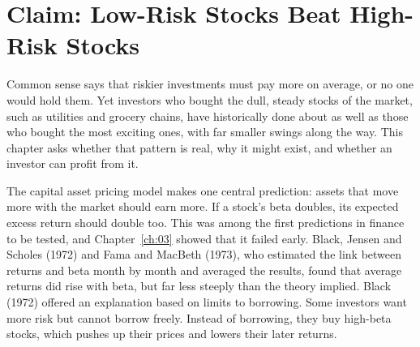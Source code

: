 \makeatletter
{}
\makeatother

\makeatletter
\makeatother

\chapter{Claim: Low-Risk Stocks Beat High-Risk Stocks}
\label{ch:14}

Common sense says that riskier investments must pay more on average, or no one would hold them. Yet investors who bought the dull, steady stocks of the market, such as utilities and grocery chains, have historically done about as well as those who bought the most exciting ones, with far smaller swings along the way. This chapter asks whether that pattern is real, why it might exist, and whether an investor can profit from it.

The capital asset pricing model makes one central prediction: assets that move more with the market should earn more. If a stock's beta doubles, its expected excess return should double too. This was among the first predictions in finance to be tested, and Chapter~\ref{ch:03} showed that it failed early. Black, Jensen and Scholes (1972) and Fama and MacBeth (1973), who estimated the link between returns and beta month by month and averaged the results, found that average returns did rise with beta, but far less steeply than the theory implied. Black (1972) offered an explanation based on limits to borrowing. Some investors want more risk but cannot borrow freely. Instead of borrowing, they buy high-beta stocks, which pushes up their prices and lowers their later returns.

